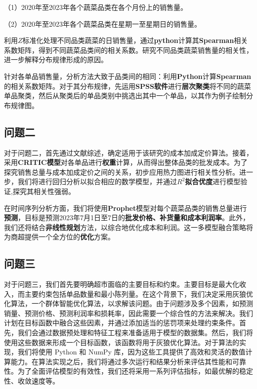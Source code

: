 \documentclass[withoutpreface,bwprint]{cumcmthesis} %
\begin{document}
（1）2020年至2023年各个蔬菜品类在各个月份上的销售量。

（2）2020年至2023年各个蔬菜品类在星期一至星期日的销售量。

利用$Z$标准化处理不同品类蔬菜的日销售量，通过\textbf{python}计算其\textbf{Spearman}相关系数矩阵，得到不同蔬菜品类间的相关系数。研究不同品类蔬菜销售量的相关性，进一步解释分布规律形成的原因。

针对各单品销售量，分析方法大致于品类间的相同：利用\textbf{Python}计算\textbf{Spearman}的相关系数矩阵。对于其分布规律，先运用\textbf{SPSS软件}进行\textbf{层次聚类}将不同的蔬菜单品聚类，然后从聚类后的单品类别中挑选出其中一个单品，以其作为例子绘制分布规律图。


\subsection{问题二}
对于问题二，首先通过文献综述，确定适用于该研究的成本加成定价算法。接着，采用\textbf{CRITIC模型}对各单品进行\textbf{权重}计算，从而得出整体品类的批发成本。为了探究销售总量与成本加成定价之间的关系，初步应用热力图进行相关性分析。进一步，我们将进行回归分析以拟合相应的数学模型，并通过\textbf{$R^2$拟合优度}进行模型验证,探究其相关性强弱。

在时间序列分析方面，我们将使用\textbf{Prophet}模型对每个蔬菜品类的销售总量进行\textbf{预测}，目标是预测2023年7月1日至7日的\textbf{批发价格、补货量和成本利润率}。此外，我们还将结合\textbf{非线性规划}方法，以综合地优化成本和利润。这一多模型融合策略将为商超提供一个全方位的\textbf{优化}方案。




\subsection{问题三}
对于问题三，我们首先要明确超市面临的主要目标和约束。主要目标是最大化收入，而主要约束包括单品数量和最小陈列量。在这个背景下，我们决定采用灰狼优化算法，一个群体智能优化算法，以求解该问题。由于问题涉及多个因素，如预测销量、预测价格、预测利润率和损耗率，因此需要一个综合性的方法来解决。我们计划在目标函数中融合这些因素，并通过添加适当的惩罚项来处理约束条件。首先，我们会通过数据预处理和特征工程来准备适用于模型的数据集。然后，我们将使用这些数据来形成一个目标函数，该函数将用于灰狼优化算法。对于算法的实现，我们将使用 Python 和 NumPy 库，因为这些工具提供了高效和灵活的数值计算能力。在算法实现之后，我们将通过多次运行和结果分析来评估其性能和可靠性。为了全面评估模型的有效性，我们还将采用一系列评估指标，如最优解的稳定性、收敛速度等。
\end{document}
